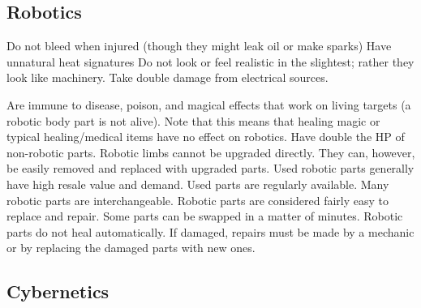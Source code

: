\documentclass[twoside]{book}
\begin{document}
\subsection{Robotics}
      
                  Do not bleed when injured (though they might leak
                 oil or make sparks) 
                Have unnatural heat signatures   
                  Do not look or feel realistic in the slightest;
                 rather they look like machinery. 
                  Take double damage from electrical sources.
                 
                  Are immune to disease, poison, and magical
                 effects that work on living targets (a robotic body part
                 is not alive). Note that this means that healing magic
                 or typical healing/medical items have no effect on
                 robotics. 
                Have double the HP of non-robotic parts.   
                  Robotic limbs cannot be upgraded directly. They
                 can, however, be easily removed and replaced with
                 upgraded parts. 
                  Used robotic parts generally have high resale
                 value and demand. Used parts are regularly available.
                 Many robotic parts are interchangeable. 
                  Robotic parts are considered fairly easy to
                 replace and repair. Some parts can be swapped in a
                 matter of minutes. 
                  Robotic parts do not heal automatically. If
                 damaged, repairs must be made by a mechanic or by
                 replacing the damaged parts with new ones. 
            
\subsection{Cybernetics}
      
\end{document}
